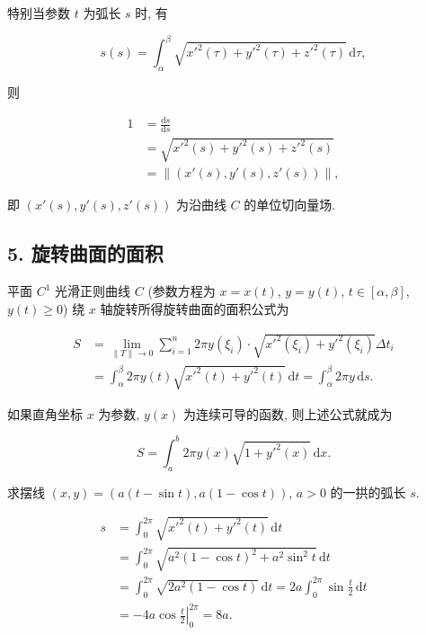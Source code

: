 特别当参数 $t$ 为弧长 $s$ 时, 有

\[
s(s)=\int_{\alpha}^{\beta}\sqrt{x'^{2}(\tau)+y'^{2}(\tau)+z'^{2}(\tau)}\,\mathrm{d}\tau,
\]

则

\[
\begin{aligned}
1&=\frac{\mathrm{d}s}{\mathrm{d}s}\\
&=\sqrt{x'^{2}(s)+y'^{2}(s)+z'^{2}(s)}\\
&=\|(x'(s),y'(s),z'(s))\|,
\end{aligned}
\]

即 $(x'(s),y'(s),z'(s))$ 为沿曲线 $C$ 的单位切向量场.

\subsection*{5. 旋转曲面的面积}

平面 $C^{1}$ 光滑正则曲线 $C$ (参数方程为 $x=x(t)$, $y=y(t)$, $t\in[\alpha,\beta]$, $y(t)\geqslant0$) 绕 $x$ 轴旋转所得旋转曲面的面积公式为

\[
\begin{aligned}
S&=\lim_{\|T\|\to0}\sum_{i=1}^{n}2\pi y(\xi_{i})\cdot\sqrt{x'^{2}(\xi_{i})+y'^{2}(\xi_{i})}\Delta t_{i}\\
&=\int_{\alpha}^{\beta}2\pi y(t)\sqrt{x'^{2}(t)+y'^{2}(t)}\,\mathrm{d}t=\int_{\alpha}^{\beta}2\pi y\,\mathrm{d}s.
\end{aligned}
\]

如果直角坐标 $x$ 为参数, $y(x)$ 为连续可导的函数, 则上述公式就成为

\[
S=\int_{a}^{b}2\pi y(x)\sqrt{1+y'^{2}(x)}\,\mathrm{d}x.
\]

\begin{example}\label{ex:6.6.9}
求摆线 $(x,y)=(a(t-\sin t),a(1-\cos t))$, $a>0$ 的一拱的弧长 $s$.
\end{example}

\begin{solution}
\[
\begin{aligned}
s&=\int_{0}^{2\pi}\sqrt{x'^{2}(t)+y'^{2}(t)}\,\mathrm{d}t\\
&=\int_{0}^{2\pi}\sqrt{a^{2}(1-\cos t)^{2}+a^{2}\sin^{2}t}\,\mathrm{d}t\\
&=\int_{0}^{2\pi}\sqrt{2a^{2}(1-\cos t)}\,\mathrm{d}t=2a\int_{0}^{2\pi}\sin\frac{t}{2}\,\mathrm{d}t\\
&=\left.-4a\cos\frac{t}{2}\right|_{0}^{2\pi}=8a.
\end{aligned}
\]
\end{solution}

